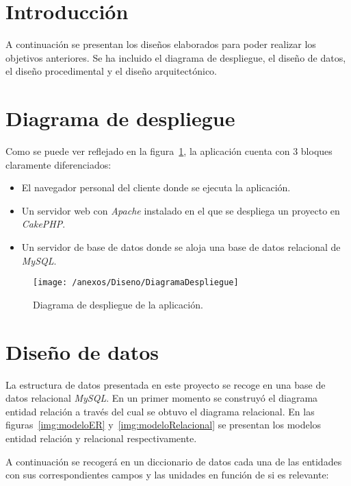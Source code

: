 
\section{Introducción}

A continuación se presentan los diseños elaborados para poder realizar los objetivos anteriores. Se ha incluido el diagrama de despliegue, el diseño de datos, el diseño procedimental y el diseño arquitectónico.

\section{Diagrama de despliegue}

Como se puede ver reflejado en la figura~\ref{img:diagramaDespliegue}, la aplicación cuenta con 3 bloques claramente diferenciados:

\begin{itemize}
	\item El navegador personal del cliente donde se ejecuta la aplicación. 
	\item Un servidor web con \textit{Apache} instalado en el que se despliega un proyecto en \textit{CakePHP}.
	\item Un servidor de base de datos donde se aloja una base de datos relacional de \textit{MySQL}.
\end{itemize}

\begin{figure}[h]
	\centering
	\texttt{[image: /anexos/Diseno/DiagramaDespliegue]}
	\caption{Diagrama de despliegue de la aplicación.}
	\label{img:diagramaDespliegue}
\end{figure}

\section{Diseño de datos}

La estructura de datos presentada en este proyecto se recoge en una base de datos relacional \textit{MySQL}. En un primer momento se construyó el diagrama entidad relación a través del cual se obtuvo el diagrama relacional. En las figuras~\ref{img:modeloER} y~\ref{img:modeloRelacional} se presentan los modelos entidad relación y relacional respectivamente.

A continuación se recogerá en un diccionario de datos cada una de las entidades con sus correspondientes campos y las unidades en función de si es relevante:

